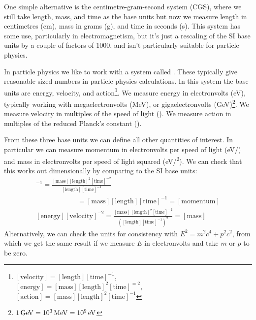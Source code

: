 \documentclass[fleqn]{NotesClass}
\begin{document}
    One simple alternative is the centimetre-gram-second system (CGS), where we still take length, mass, and time as the base units but now we measure length in centimetres (\unit{\centi\metre}), mass in grams (\unit{\gram}), and time in seconds (\unit{\second}).
    This system has some use, particularly in electromagnetism, but it's just a rescaling of the SI base units by a couple of factors of 1000, and isn't particularly suitable for particle physics.
    
    In particle physics we like to work with a system called .
    These typically give reasonable sized numbers in particle physics calculations.
    In this system the base units are energy, velocity, and action\footnote{\scriptsize \([\mathrm{velocity}] = [\mathrm{length}][\mathrm{time}]^{-1}\),\\\([\mathrm{energy}] = [\mathrm{mass}][\mathrm{length}]^2[\mathrm{time}]^{=2}\),\\\([\mathrm{action}] = [\mathrm{mass}][\mathrm{length}]^{2}[\mathrm{time}]^{-1}\)}.
    We measure energy in electronvolts (\unit{\electronvolt}), typically working with megaelectronvolts (\unit{\mega\electronvolt}), or gigaelectronvolts (\unit{\giga\electronvolt})\footnote{\(\qty{1}{\giga\electronvolt} = 10^3\,\unit{\mega\electronvolt} = 10^9\,\unit{\mathrm{\electronvolt}}\)}.
    We measure velocity in multiples of the speed of light (\unit{\speedoflight}).
    We measure action in multiples of the reduced Planck's constant (\unit{\hbarunit}).
    
    From these three base units we can define all other quantities of interest.
    In particular we can measure momentum in electronvolts per speed of light (\unit[per-mode=symbol]{\electronvolt\per\speedoflight}) and mass in electronvolts per speed of light squared (\unit[per-mode=symbol]{\electronvolt\per\speedoflight\squared}).
    We can check that this works out dimensionally by comparing to the SI base units:
    \begin{gather}
        [\mathrm{energy}][\mathrm{velocity}]^{-1} = \frac{[\mathrm{mass}][\mathrm{length}]^2[\mathrm{time}]^{-2}}{[\mathrm{length}] [\mathrm{time}]^{-1}}\\
        \qquad\qquad\qquad= [\mathrm{mass}][\mathrm{length}][\mathrm{time}]^{-1} = [\mathrm{momentum}]\\
        [\mathrm{energy}][\mathrm{velocity}]^{-2} = \frac{[\mathrm{mass}][\mathrm{length}]^2[\mathrm{time}]^{-2}}{([\mathrm{length}] [\mathrm{time}]^{-1})^2} = [\mathrm{mass}]
    \end{gather}
    Alternatively, we can check the units for consistency with \(E^2 = m^2c^4 + p^2c^2\), from which we get the same result if we measure \(E\) in electronvolts and take \(m\) or \(p\) to be zero.
    
\end{document}
